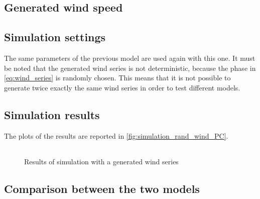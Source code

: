 \subsection{Generated wind speed}
\subsection{Simulation settings}
The same parameters of the previous model are used again with this one. It must be noted that the generated wind series is not deterministic, because the phase in \autoref{eq:wind_series} is randomly chosen. This means that it is not possible to generate twice exactly the same wind series in order to test different models.
\subsection{Simulation results}
The plots of the results are reported in \autoref{fig:simulation_rand_wind_PC}.
\begin{figure}[htb]
  \centering
  \begin{tabular}{@{}cc@{}}
  \end{tabular}
  \caption{Results of simulation with a generated wind series}
  \label{fig:simulation_rand_wind_PC}
\end{figure}

\subsection{Comparison between the two models}
